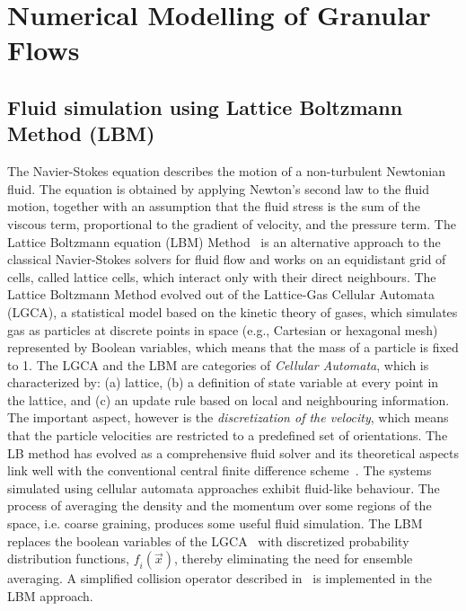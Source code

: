 \chapter{Numerical Modelling of Granular Flows}
\section{Fluid simulation using Lattice Boltzmann Method (LBM)}
The Navier-Stokes equation describes the motion of a non-turbulent Newtonian fluid. The equation is obtained by applying Newton's second law to the fluid motion, together with an assumption that the fluid stress is the sum of the viscous term, proportional to the gradient of velocity, and the pressure term. The Lattice Boltzmann equation (LBM) Method~\citep{chen1998} is an alternative approach to the classical Navier-Stokes solvers for fluid flow and works on an equidistant grid of cells, called lattice cells, which interact only with their direct neighbours. The Lattice Boltzmann Method evolved out of the Lattice-Gas Cellular Automata (LGCA), a statistical model based on the kinetic theory of gases, which simulates gas as particles at discrete points in space (e.g., Cartesian or hexagonal mesh) represented by Boolean variables, which means that the mass of a particle is fixed to 1. The LGCA and the LBM are categories of \textit{Cellular Automata}, which is characterized by: (a) lattice, (b) a definition of state variable at every point in the lattice, and (c) an update rule based on local and neighbouring information. The important aspect, however is the \textit{discretization of the velocity}, which means that the particle velocities are restricted to a predefined set of orientations. The LB method has evolved as a comprehensive fluid solver and its theoretical aspects link well with the conventional central finite difference scheme~\citep{cook2004}. The systems simulated using cellular automata approaches exhibit fluid-like behaviour. The process of averaging the density and the momentum over some regions of the space, i.e. coarse graining, produces some useful fluid simulation. The LBM replaces the boolean variables of the LGCA~\citep{wolf2000} with discretized probability distribution functions, $\textit{f}_{\textit{i}}(\overrightarrow{x})$, thereby eliminating the need for ensemble averaging. A simplified collision operator described in~\citet{Bhat1954} is implemented in the LBM approach.  


